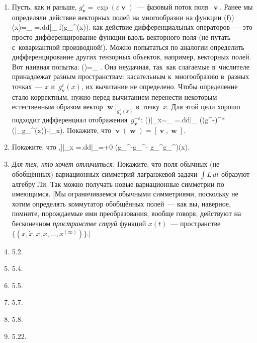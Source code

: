 \documentclass[a4paper,11pt]{article}
\def\[#1\]{\begin{align*}#1\end{align*}}
\theoremstyle{definition}
\begin{document}
\begin{enumerate}
\item
Пусть, как и раньше, $g_\mbfv^\varepsilon=\exp(\varepsilon\mbfv)$~— фазовый поток
поля~$\mbfv$. Ранее мы определяли действие векторных полей на многообразии на
функции
	\[
	(\mbfv(f))(x)=\lim_{\varepsilon{}}\varepsilon
		=\left.\frac d{d\varepsilon}\right|_{}
		f(g_\mbfv^\varepsilon(x)).
	\]
как действие дифференциальных операторов~— это просто дифференцирование функции
вдоль векторного поля (не путать с~ковариантной производной!).
Можно попытаться по аналогии определить дифференцирование других тензорных
объектов, например, векторных полей. Вот наивная попытка:
	\[
	\mbfv(\mbfw)=\lim_{\varepsilon{}}
		\varepsilon.
	\]
Она неудачная, так~как слагаемые в~числителе принадлежат разным
пространствам: касательным к~многообразию в~разных точках~— $x$
и~$g_\mbfv^\varepsilon(x)$, их вычитание не определено. Чтобы определение стало
корректным, нужно перед вычитанием перенести некоторым естественным образом
вектор $\mbfw|_{g_\mbfv^\varepsilon(x)}$ в~точку~$x$. Для этой цели хорошо
подходит дифференциал отображения~$g_\mbfv^{-\varepsilon}$:
	\[
	\mbfv(\mbfw)|_x=\lim_{\varepsilon{}}
		\varepsilon
		=\left.\frac d{d\varepsilon}\right|_{}
		\left((g^{-\varepsilon})^*(\mbfw|_{g_\mbfv^\varepsilon(x)})-\mbfw|_x\right).
	\]
Покажите, что $\mbfv(\mbfw)=[\mbfv,\mbfw]$.

\item
Покажите, что
	\[
	[\mbfv,\mbfw]|_x
		=\left.\frac d{d\varepsilon}\right|_{\varepsilon=+0}
		\left(g_\mbfw^{-\sqrt\varepsilon}\circ g_\mbfv^{-\sqrt\varepsilon}
		\circ g_\mbfw^{\sqrt\varepsilon}\circ g_\mbfv^{\sqrt\varepsilon}\right)(x).
	\]

\item
\emph{Для тех, кто хочет отличиться.} Покажите, что поля обычных (не
обобщённых) вариационных симметрий лагранжевой задачи $\int L\,dt$ образуют
алгебру Ли. Так можно получать новые вариационные симметрии по имеющимся. [Мы
ограничиваемся обычными симметриями, поскольку не хотим определять коммутатор
обобщённых полей~— как вы, наверное, помните, порождаемые ими преобразования,
вообще говоря, действуют на бесконечном \emph{пространстве струй\/} функций
$x(t)$~— пространстве $\{(x,\dot x,\ddot x,\dddot x,\ldots,x^{(\infty)})\}$.]

\item
5.2.

\item
5.4.

\item
5.5.

\item
5.7.

\item
5.8.

\item
5.22.

\end{enumerate}
\end{document}
